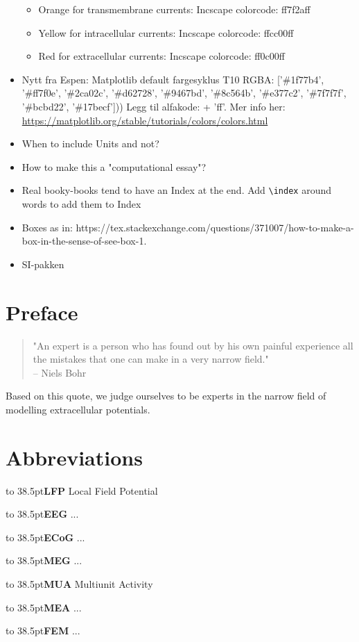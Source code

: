 \documentclass[prodtf]{EngC}
\numberwithin{equation}{chapter}
\numberwithin{figure}{chapter}
\numberwithin{table}{chapter}
\begin{document}
\begin{itemize}
\begin{itemize}
	\item Orange for transmembrane currents: Incscape colorcode: ff7f2aff
	\item Yellow for intracellular currents: Incscape colorcode: ffcc00ff
	\item Red for extracellular currents: Incscape colorcode: ff0c00ff
	\end{itemize}
\item Nytt fra Espen: Matplotlib default fargesyklus T10 RGBA: ['\#1f77b4', '\#ff7f0e', '\#2ca02c', '\#d62728', '\#9467bd', '\#8c564b', '\#e377c2', '\#7f7f7f', '\#bcbd22', '\#17becf'])) Legg til alfakode: + 'ff'. Mer info her: \href{https://matplotlib.org/stable/tutorials/colors/colors.html}{https://matplotlib.org/stable/tutorials/colors/colors.html}
\item When to include Units and not?
\item How to make this a "computational essay"?
\item Real booky-books tend to have an Index at the end. Add \verb|\index| around words to add them to Index
\item Boxes as in: https://tex.stackexchange.com/questions/371007/how-to-make-a-box-in-the-sense-of-see-box-1. 
\item SI-pakken %

\end{itemize}
\begin{flushright}\baselineskip
\end{flushright}


\chapter*{Preface}
\begin{quote}
\flushright
"An expert is a person who has found out by his own painful experience all the mistakes that one can make in a very narrow field."\\
-- Niels Bohr
\end{quote}
Based on this quote, we judge ourselves to be experts in the narrow field of modelling extracellular potentials.


\def\acrodef#1#2{\noindent\hbox to 38.5pt{\textbf{#1}} #2\par}
\chapter*{Abbreviations}
\acrodef{LFP}{Local Field Potential}
\acrodef{EEG}{...}
\acrodef{ECoG}{...}
\acrodef{MEG}{...}
\acrodef{MUA}{Multiunit Activity}
\acrodef{MEA}{...}
\acrodef{FEM}{...}
\end{document}
